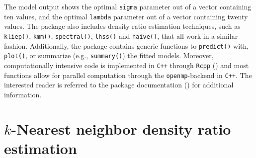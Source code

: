 \documentclass[
]{article}
\begin{document}
\linespread{2}

The model output shows the optimal \texttt{sigma} parameter out of a
vector containing ten values, and the optimal \texttt{lambda} parameter
out of a vector containing twenty values. The package also includes
density ratio estimation techniques, such as \texttt{kliep()},
\texttt{kmm()}, \texttt{spectral()}, \texttt{lhss()} and
\texttt{naive()}, that all work in a similar fashion. Additionally, the
package contains generic functions to \texttt{predict()} with,
\texttt{plot()}, or summarize (e.g., \texttt{summary()}) the fitted
models. Moreover, computationally intensive code is implemented in
\texttt{C++} through \texttt{Rcpp} () and most functions allow for parallel computation through the
\texttt{openmp}-backend in \texttt{C++}. The interested reader is
referred to the package documentation
() for additional information.

\section{\texorpdfstring{\(k\)-Nearest neighbor density ratio
estimation}{k-Nearest neighbor density ratio estimation}}\label{sec-app-B}
\end{document}
